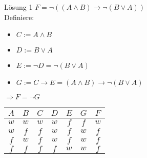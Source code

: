 \begin{frame}{Lösung 1}
	$F = \neg((A\wedge B)\rightarrow\neg(B\vee A))$\\
	Definiere:\\
	\begin{itemize}
		\item $C:=A\wedge B$
		\item $D:=B\vee A$
		\item $E:=\neg D=\neg(B\vee A)$
		\item $G:=C\rightarrow E=(A\wedge B)\rightarrow\neg(B\vee A)$
	\end{itemize}
	$\Rightarrow F=\neg G$\\
	\begin{tabular}{cc|cccc|c}
		$A$ & $B$ & $C$ & $D$ & $E$ & $G$ & $F$ \\
		\hline
		$w$ & $w$ & $w$ & $w$ & $f$ & $f$ & $w$ \\
		$w$ & $f$ & $f$ & $w$ & $f$ & $w$ & $f$ \\
		$f$ & $w$ & $f$ & $w$ & $f$ & $w$ & $f$ \\
		$f$ & $f$ & $f$ & $f$ & $w$ & $w$ & $f$ \\
	\end{tabular}
\end{frame}
